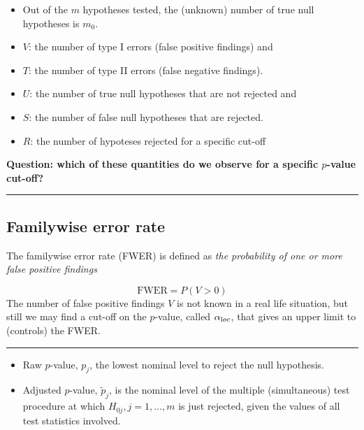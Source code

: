 \documentclass[
  letterpaper,
  DIV=11,
  numbers=noendperiod]{scrartcl}
\providecommand{\tightlist}{%
  \setlength{\itemsep}{0pt}\setlength{\parskip}{0pt}}\usepackage{longtable,booktabs,array}
\begin{document}
\begin{itemize}
\tightlist
\item
  Out of the \(m\) hypotheses tested, the (unknown) number of true null
  hypotheses is \(m_0\).
\item
  \(V\): the number of type I errors (false positive findings) and
\item
  \(T\): the number of type II errors (false negative findings).
\item
  \(U\): the number of true null hypotheses that are not rejected and
\item
  \(S\): the number of false null hypotheses that are rejected.
\item
  \(R\): the number of hypoteses rejected for a specific cut-off
\end{itemize}

\textbf{Question: which of these quantities do we observe for a specific
\(p\)-value cut-off?}

\begin{center}\rule{0.5\linewidth}{0.5pt}\end{center}

\hypertarget{familywise-error-rate}{%
\subsection{Familywise error rate}\label{familywise-error-rate}}

The familywise error rate (FWER) is defined as \emph{the probability of
one or more false positive findings}

\[ \text{FWER} = P(V > 0) \] The number of false positive findings \(V\)
is not known in a real life situation, but still we may find a cut-off
on the \(p\)-value, called \(\alpha_{\text loc}\), that gives an upper
limit to (controls) the FWER.

\begin{center}\rule{0.5\linewidth}{0.5pt}\end{center}

\begin{itemize}
\tightlist
\item
  Raw \(p\)-value, \(p_j\), the lowest nominal level to reject the null
  hypothesis.\\
\item
  Adjusted \(p\)-value, \(\tilde{p}_j\), is the nominal level of the
  multiple (simultaneous) test procedure at which
  \(H_{0j}, j=1,\ldots,m\) is just rejected, given the values of all
  test statistics involved.
\end{itemize}
\end{document}
